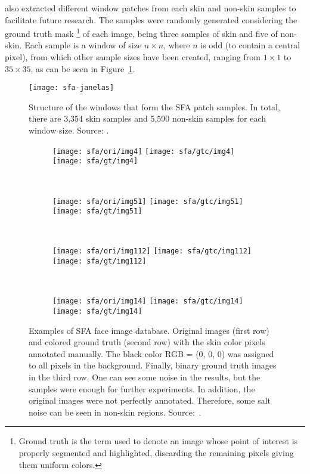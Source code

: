 \citet{sfa-skin-dataset:13} also extracted different window patches from each skin and non-skin samples to facilitate future research. The samples were randomly generated considering the ground truth mask \footnote{Ground truth is the term used to denote an image whose point of interest is properly segmented and highlighted, discarding the remaining pixels giving them uniform colors.} of each image, being three samples of skin and five of non-skin. Each sample is a window of size $n \times n$, where $n$ is odd (to contain a central pixel), from which other sample sizes have been created, ranging from $1 \times 1$ to $35 \times 35$, as can be seen in Figure~\ref{fig:sfa_dataset_janelas}.

\begin{figure}[!htb]
  \centering
  \texttt{[image: sfa-janelas]}
  \caption[Structure of the windows that form the SFA patch samples]{Structure of the windows that form the SFA patch samples. In total, there are 3,354 skin samples and 5,590 non-skin samples for each window size. Source: \citet{sfa-skin-dataset:13}.}
  \label{fig:sfa_dataset_janelas}
\end{figure}

\begin{figure}[H]
    \centering
    \begin{subfigure}[t]{0.2\textwidth}
        \texttt{[image: sfa/ori/img4]}
        \texttt{[image: sfa/gtc/img4]}
        \texttt{[image: sfa/gt/img4]}
    \end{subfigure}
    ~
    \begin{subfigure}[t]{0.2\textwidth}
        \texttt{[image: sfa/ori/img51]}
        \texttt{[image: sfa/gtc/img51]}
        \texttt{[image: sfa/gt/img51]}
    \end{subfigure}
    ~
    \begin{subfigure}[t]{0.2\textwidth}
        \texttt{[image: sfa/ori/img112]}
        \texttt{[image: sfa/gtc/img112]}
        \texttt{[image: sfa/gt/img112]}
    \end{subfigure}
    ~ %
    \begin{subfigure}[t]{0.2\textwidth}
        \texttt{[image: sfa/ori/img14]}
        \texttt{[image: sfa/gtc/img14]}
        \texttt{[image: sfa/gt/img14]}
    \end{subfigure}
    \caption[Examples of SFA face image database]{Examples of SFA face image database. Original images (first row) and colored ground truth (second row) with the skin color pixels annotated manually. The black color RGB = (0, 0, 0) was assigned to all pixels in the background. Finally, binary ground truth images in the third row. One can see some noise in the results, but the samples were enough for further experiments. In addition, the original images were not perfectly annotated. Therefore, some salt noise can be seen in non-skin regions. Source:~\citet{sfa-skin-dataset:13}.}
    \label{fig:sfa_dataset_exemplo}
\end{figure}

